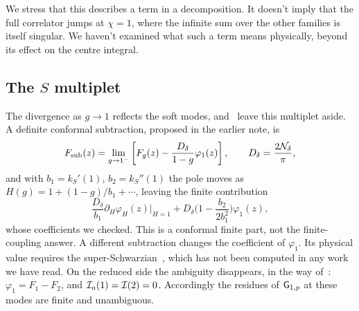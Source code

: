 We stress that this describes a term in a decomposition. It doesn't imply that the full correlator jumps at $\chi=1$, where the infinite sum over the other families is itself singular. We haven't examined what such a term means physically, beyond its effect on the centre integral.

\subsection{The $S$ multiplet}

The divergence as $g\to1$ reflects the soft modes, and~\cite{Bulycheva:2018qcp,Peng:2017spg} leave this multiplet aside. A definite conformal subtraction, proposed in the earlier note, is
\begin{equation}
F_{\rm sub}(z)=\lim_{g\to1^-}\left[F_g(z)-\frac{D_\delta}{1-g}\varphi_1(z)\right],\qquad D_\delta=\frac{2\mathcal{N}_\delta}{\pi},
\end{equation}
and with $b_1=k_S'(1)$, $b_2=k_S''(1)$ the pole moves as $H(g)=1+(1-g)/b_1+\cdots$, leaving the finite contribution
\begin{equation}\label{eq:finite-part}
\frac{D_\delta}{b_1}\partial_H\varphi_H(z)\Big|_{H=1}+D_\delta\Big(1-\frac{b_2}{2b_1^2}\Big)\varphi_1(z),
\end{equation}
whose coefficients we checked. This is a conformal finite part, not the finite-coupling answer. A different subtraction changes the coefficient of $\varphi_1$. Its physical value requires the super-Schwarzian~\cite{Fu:2016vas}, which has not been computed in any work we have read. On the reduced side the ambiguity disappears, in the way of~\cite[(C.12)]{Thong:2026}: $\varphi_1=F_1-F_2$, and $\mathcal{I}_a(1)=\mathcal{I}(2)=0$. Accordingly the residues of $\mathsf{G}_{1,p}$ at these modes are finite and unambiguous.

